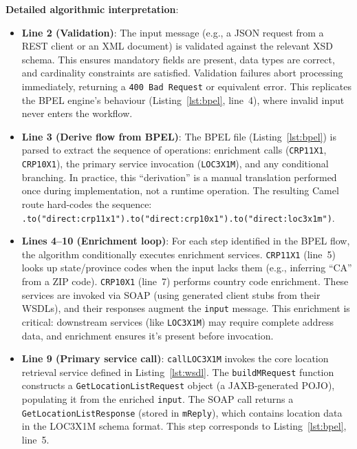 \documentclass[11pt]{article}
\begin{document}
\noindent\textbf{Detailed algorithmic interpretation}:
\begin{itemize}
  \item \textbf{Line 2 (Validation)}: The input message (e.g., a JSON request from a REST client or an XML document) is validated against the relevant XSD schema. This ensures mandatory fields are present, data types are correct, and cardinality constraints are satisfied. Validation failures abort processing immediately, returning a \texttt{400 Bad Request} or equivalent error. This replicates the BPEL engine's behaviour (Listing~\ref{lst:bpel}, line~4), where invalid input never enters the workflow.

  \item \textbf{Line 3 (Derive flow from BPEL)}: The BPEL file (Listing~\ref{lst:bpel}) is parsed to extract the sequence of operations: enrichment calls (\texttt{CRP11X1}, \texttt{CRP10X1}), the primary service invocation (\texttt{LOC3X1M}), and any conditional branching. In practice, this ``derivation'' is a manual translation performed once during implementation, not a runtime operation. The resulting Camel route hard-codes the sequence: \texttt{.to("direct:crp11x1").to("direct:crp10x1").to("direct:loc3x1m")}.

  \item \textbf{Lines 4--10 (Enrichment loop)}: For each step identified in the BPEL flow, the algorithm conditionally executes enrichment services. \texttt{CRP11X1} (line~5) looks up state/province codes when the input lacks them (e.g., inferring ``CA'' from a ZIP code). \texttt{CRP10X1} (line~7) performs country code enrichment. These services are invoked via SOAP (using generated client stubs from their WSDLs), and their responses augment the \texttt{input} message. This enrichment is critical: downstream services (like \texttt{LOC3X1M}) may require complete address data, and enrichment ensures it's present before invocation.

  \item \textbf{Line 9 (Primary service call)}: \texttt{callLOC3X1M} invokes the core location retrieval service defined in Listing~\ref{lst:wsdl}. The \texttt{buildMRequest} function constructs a \texttt{GetLocationListRequest} object (a JAXB-generated POJO), populating it from the enriched \texttt{input}. The SOAP call returns a \texttt{GetLocationListResponse} (stored in \texttt{mReply}), which contains location data in the LOC3X1M schema format. This step corresponds to Listing~\ref{lst:bpel}, line~5.


\end{itemize}
\end{document}
